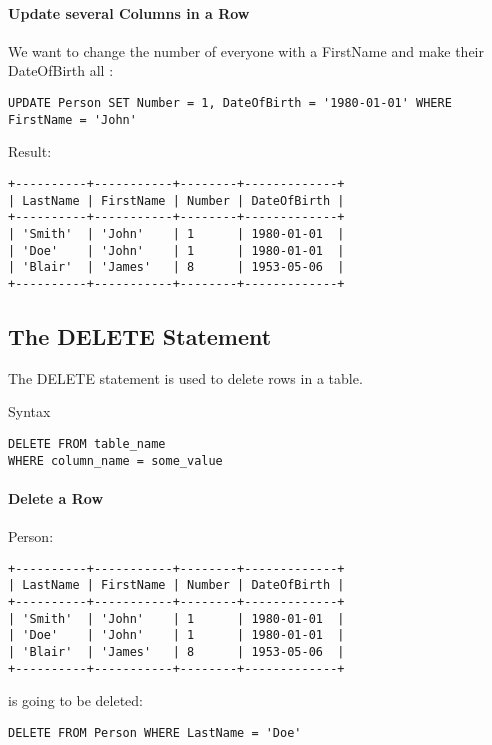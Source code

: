 \documentclass{howto}
\begin{document}
\paragraph{Update several Columns in a Row}

We want to change the number of everyone with a FirstName  and make their DateOfBirth all :

\begin{verbatim}
UPDATE Person SET Number = 1, DateOfBirth = '1980-01-01' WHERE FirstName = 'John'
\end{verbatim}
Result:
\begin{verbatim}
+----------+-----------+--------+-------------+
| LastName | FirstName | Number | DateOfBirth |
+----------+-----------+--------+-------------+
| 'Smith'  | 'John'    | 1      | 1980-01-01  |
| 'Doe'    | 'John'    | 1      | 1980-01-01  |
| 'Blair'  | 'James'   | 8      | 1953-05-06  |
+----------+-----------+--------+-------------+
\end{verbatim}


\subsection{The DELETE Statement}

The DELETE statement is used to delete rows in a table.

Syntax
\begin{verbatim}
DELETE FROM table_name
WHERE column_name = some_value
\end{verbatim}

\paragraph{Delete a Row}

Person:
\begin{verbatim}
+----------+-----------+--------+-------------+
| LastName | FirstName | Number | DateOfBirth |
+----------+-----------+--------+-------------+
| 'Smith'  | 'John'    | 1      | 1980-01-01  |
| 'Doe'    | 'John'    | 1      | 1980-01-01  |
| 'Blair'  | 'James'   | 8      | 1953-05-06  |
+----------+-----------+--------+-------------+
\end{verbatim}

 is going to be deleted:

\begin{verbatim}
DELETE FROM Person WHERE LastName = 'Doe'
\end{verbatim}
\end{document}
